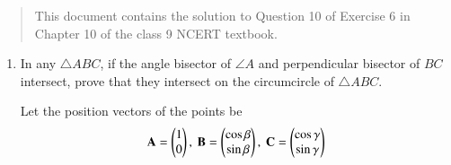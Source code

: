 \documentclass[journal,12pt,twocolumn]{IEEEtran}
\begin{document}
\begin{abstract}
    This document contains the solution to Question 10 of 
    Exercise 6 in Chapter 10 of the class 9 NCERT textbook.
\end{abstract}

\begin{enumerate}
    \item In any $\triangle ABC$, if the angle bisector of $\angle A$ and 
    perpendicular bisector of $BC$ intersect, prove that they intersect on 
    the circumcircle of $\triangle ABC$.

    \solution Let the position vectors of the points be
    \begin{align}
        \mathbf{A} = \begin{pmatrix}1\\0\end{pmatrix},\ \mathbf{B} = \begin{pmatrix}\cos\beta\\\sin\beta\end{pmatrix},\ \mathbf{C} = \begin{pmatrix}\cos\gamma\\\sin\gamma\end{pmatrix}
        \label{eq:pts}
    \end{align}


\end{enumerate}
\end{document}
